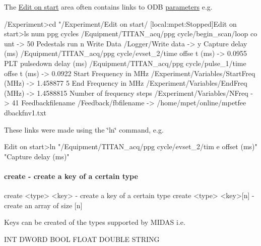 The \hyperlink{RC_customize_ODB_RC_Edit_On_Start}{Edit on start} area often contains links to ODB \hyperlink{structparameters}{parameters} e.g. 
\begin{DoxyCode}
/Experiment>cd "/Experiment/Edit on start/
[local:mpet:Stopped]Edit on start>ls
num ppg cycles                  /Equipment/TITAN_acq/ppg cycle/begin_scan/loop co
      unt -> 50
Pedestals run                   n
Write Data                      /Logger/Write data -> y
Capture delay (ms)              /Equipment/TITAN_acq/ppg cycle/evset_2/time offse
      t (ms) -> 0.0955
PLT pulsedown delay (ms)        /Equipment/TITAN_acq/ppg cycle/pulse_1/time offse
      t (ms) -> 0.0922
Start Frequency in MHz          /Experiment/Variables/StartFreq (MHz) -> 1.458877
      5
End Frequency in MHz            /Experiment/Variables/EndFreq (MHz) -> 1.4588815
Number of frequency steps       /Experiment/Variables/NFreq -> 41
Feedbackfilename                /Feedback/fbfilename -> /home/mpet/online/mpetfee
      dbackfnv1.txt
\end{DoxyCode}


These links were made using the \char`\"{}ln\char`\"{} command, e.g. 
\begin{DoxyCode}
Edit on start>ln  "/Equipment/TITAN_acq/ppg cycle/evset_2/tim
      e offset (ms)" "Capture delay (ms)"
\end{DoxyCode}




\hypertarget{RC_odbedit_examples_RC_odbedit_cr}{}\paragraph{create -\/ create a key of a certain type}\label{RC_odbedit_examples_RC_odbedit_cr}

\begin{DoxyCode}
create <type> <key>     - create a key of a certain type
create <type> <key>[n]  - create an array of size [n]
\end{DoxyCode}


Keys can be created of the types supported by MIDAS i.e. \par
 INT DWORD BOOL FLOAT DOUBLE STRING


